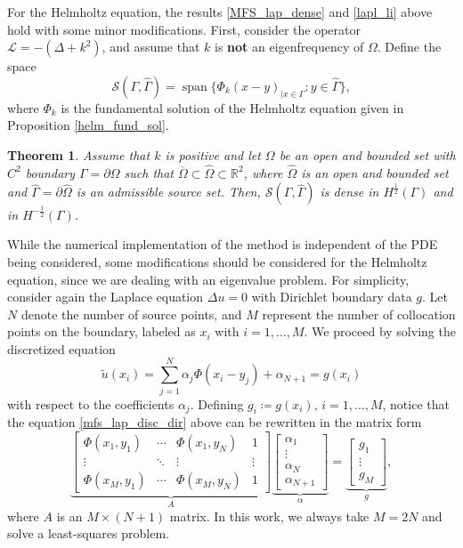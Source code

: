 \documentclass[5p,authoryear]{elsarticle}
\newtheorem{theorem}{Theorem}[subsection]
\DeclareMathOperator{\Span}{span}
\begin{document}
For the Helmholtz equation, the results \ref{MFS_lap_dense} and \ref{lapl_li} above hold with some minor modifications. First, consider the operator \(\mathcal{L} = -(\Delta + k^2)\), and assume that \(k\) is \textbf{not} an eigenfrequency of \(\Omega\). Define the space
\[
    \mathcal{S}(\Gamma, \hat{\Gamma}) = \Span\{\Phi_k(x-y)_{|x \in \Gamma} : y \in \hat{\Gamma}\},
\]
where \(\Phi_k\) is the fundamental solution of the Helmholtz equation given in Proposition \ref{helm_fund_sol}.
\begin{theorem}\label{MFS_helm_dense}
    Assume that \(k\) is positive and let \(\Omega\) be an open and bounded set with \(C^2\) boundary \(\Gamma = \partial \Omega\) such that \(\overline{\Omega} \subset \hat{\Omega} \subset \mathbb{R}^2\), where \(\hat{\Omega}\) is an open and bounded set and \(\hat{\Gamma} = \partial \hat{\Omega}\) is an admissible source set. Then, \(\mathcal{S}(\Gamma, \hat{\Gamma})\) is dense in \(H^\frac{1}{2}(\Gamma)\) and in \(H^{-\frac{1}{2}}(\Gamma)\).
\end{theorem}

While the numerical implementation of the method is independent of the PDE being considered, some modifications should be considered for the Helmholtz equation, since we are dealing with an eigenvalue problem. For simplicity, consider again the Laplace equation \(\Delta u = 0\) with Dirichlet boundary data \(g\). Let \(N\) denote the number of source points, and \(M\) represent the number of collocation points on the boundary, labeled as \(x_i\) with \(i=1,\dots, M\). We proceed by solving the discretized equation
\begin{equation}\label{mfs_lap_disc_dir}
    \tilde{u}(x_i) = \sum_{j=1}^{N} \alpha_j \Phi(x_i-y_j) + \alpha_{N+1} = g(x_i)
\end{equation}
with respect to the coefficients \(\alpha_j\). Defining \(g_i \coloneq g(x_i), \, i=1,\dots, M\), notice that the equation \eqref{mfs_lap_disc_dir} above can be rewritten in the matrix form
\begin{equation}\label{MFS_m_system}
    {\underbrace{\begin{bmatrix}
        \Phi(x_1, y_1) & \cdots & \Phi(x_1, y_N) & 1 \\
        \vdots & \ddots & \vdots & \vdots\\
        \Phi(x_M, y_1) & \cdots & \Phi(x_M, y_N) & 1
    \end{bmatrix}}_{A}}
    {\underbrace{\begin{bmatrix}
        \alpha_1\\
        \vdots\\
        \alpha_N\\
        \alpha_{N+1}
    \end{bmatrix}}_\alpha}
    =
    {\underbrace{\begin{bmatrix}
        g_1\\
        \vdots\\
        g_M
    \end{bmatrix}}_g},
\end{equation}
where \(A\) is an \(M \times (N+1)\) matrix. In this work, we always take \(M=2N\) and solve a least-squares problem.
\end{document}
